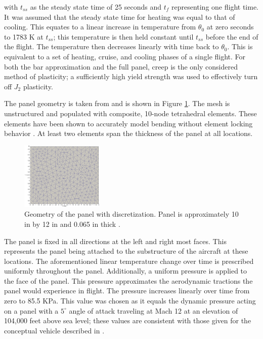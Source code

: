 \documentclass[conf]{new-aiaa}
\begin{document}
\noindent
with $t_{ss}$ as the steady state time of 25 seconds
and $t_f$ representing one flight time.
It was assumed that the steady state time for heating was
equal to that of cooling.
This equates to a linear increase in temperature from 
$\theta_0$ at zero seconds to 1783 K at $t_{ss}$;
this temperature is then held constant until $t_{ss}$ before
the end of the flight.
The temperature then decreases linearly with time back to $\theta_0$.
This is equivalent to a set of heating, cruise, and cooling phases of a single flight.
For both the bar approximation and the full panel, creep is the only
considered method of plasticity; 
a sufficiently high yield strength was used to effectively 
turn off $J_2$ plasticity.

The panel geometry is taken from 
\cite{culler_impact_of_FTS_coupling_on_response_prediction_hypersonic_skin_panels}
and is shown in Figure \ref{fig_panel_face_mesh}.
The mesh is unstructured and populated with composite, 10-node tetrahedral elements.
These elements have been shown to accurately model bending 
without element locking behavior
\cite{ostien_10_node_comp_tet_FE_for_solid_mechanics, 
  clough_automated_wing_internal_structure_placement_guided_by_FEA}.
At least two elements span the thickness of the panel at all locations. 


\begin{figure}[H] 
  \centering
    \includegraphics[width=0.35\textwidth, keepaspectratio]
    {panel_face_mesh}
  \caption{ Geometry of the panel with discretization. 
            Panel is approximately 10 in by 12 in and 0.065 in thick
            \cite{culler_impact_of_FTS_coupling_on_response_prediction_hypersonic_skin_panels}.}
  \label{fig_panel_face_mesh}
\end{figure}

\noindent
The panel is fixed in all directions at the left and right most
faces. 
This represents the panel being attached to the substructure of the aircraft
at these locations.
The aforementioned linear temperature change over time is prescribed
uniformly throughout the panel.
Additionally, a uniform pressure is applied to the face of the panel.
This pressure approximates the aerodynamic tractions the 
panel would experience in flight. 
The pressure increases linearly over time from zero to 85.5 KPa. 
This value was chosen as it equals the dynamic pressure
acting on a panel with a $5^{\circ}$ angle of attack
traveling at Mach 12 at an elevation of 104,000 feet above sea level;
these values are consistent with those given
for the conceptual vehicle described in 
\cite{culler_impact_of_FTS_coupling_on_response_prediction_hypersonic_skin_panels}.
\end{document}
